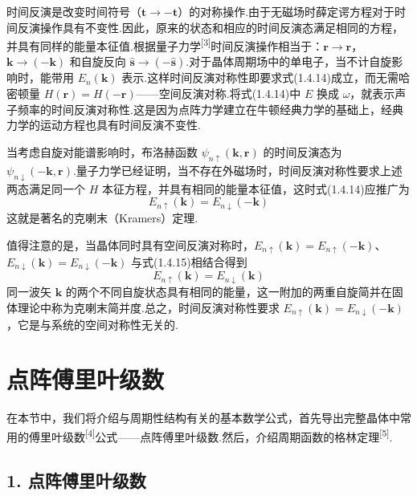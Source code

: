 时间反演是改变时间符号（$\boldsymbol{t}\to-\boldsymbol{t}$）的对称操作.由于无磁场时薛定谔方程对于时间反演操作具有不变性.因此，原来的状态和相应的时间反演态满足相同的方程，并具有同样的能量本征值.根据量子力学\textsuperscript{[3]}时间反演操作相当于：$\boldsymbol{r}\to\boldsymbol{r}$，$\boldsymbol{k}\to(-\boldsymbol{k})$ 和自旋反向 $\hat{\boldsymbol{s}}\to(-\hat{\boldsymbol{s}})$.对于晶体周期场中的单电子，当不计自旋影响时，能带用 $E_n(\boldsymbol{k})$ 表示.这样时间反演对称性即要求式(1.4.14)成立，而无需哈密顿量 $H(\boldsymbol{r})=H(-\boldsymbol{r})$——空间反演对称.将式(1.4.14)中 $E$ 换成 $\omega$，就表示声子频率的时间反演对称性.这是因为点阵力学建立在牛顿经典力学的基础上，经典力学的运动方程也具有时间反演不变性.

当考虑自旋对能谱影响时，布洛赫函数 $\psi_{n\uparrow}(\boldsymbol{k},\boldsymbol{r})$ 的时间反演态为 $\psi_{n\downarrow}(-\boldsymbol{k},\boldsymbol{r})$.量子力学已经证明，当不存在外磁场时，时间反演对称性要求上述两态满足同一个 $H$ 本征方程，并具有相同的能量本征值，这时式(1.4.14)应推广为
\begin{equation}
  E_{n\uparrow}(\boldsymbol{k})=E_{n\downarrow}(-\boldsymbol{k})
\end{equation}
这就是著名的克喇末（Kramers）定理.

值得注意的是，当晶体同时具有空间反演对称时，$E_{n\uparrow}(\boldsymbol{k})=E_{n\uparrow}(-\boldsymbol{k})$、$E_{n\downarrow}(\boldsymbol{k})=E_{n\downarrow}(-\boldsymbol{k})$ 与式(1.4.15)相结合得到
\begin{equation}
  E_{n\uparrow}(\boldsymbol{k})=E_{n\downarrow}(\boldsymbol{k})
\end{equation}
同一波矢 $\boldsymbol{k}$ 的两个不同自旋状态具有相同的能量，这一附加的两重自旋简并在固体理论中称为克喇末简并度.总之，时间反演对称性要求 $E_{n\uparrow}(\boldsymbol{k})=E_{n\downarrow}(-\boldsymbol{k})$，它是与系统的空间对称性无关的.

\section{点阵傅里叶级数}

在本节中，我们将介绍与周期性结构有关的基本数学公式，首先导出完整晶体中常用的傅里叶级数\textsuperscript{[4]}公式——点阵傅里叶级数.然后，介绍周期函数的格林定理\textsuperscript{[5]}.

\subsection*{1. 点阵傅里叶级数}


